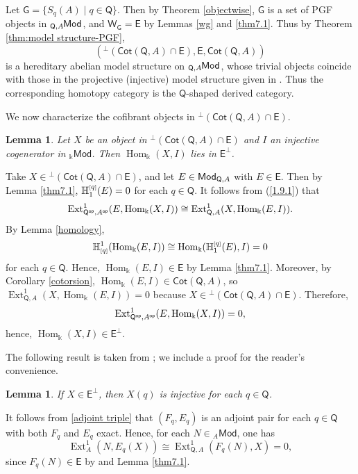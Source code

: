 \documentclass{amsart}
\theoremstyle{bfupright head,slanted body}
\theoremstyle{bfupright head,upright body}
\theoremstyle{fixed bf head,slanted body}
\newtheorem{lem}[res]{Lemma}            \newtheorem*{lem*}{Lemma}
\theoremstyle{fixed bf head,upright body}
\theoremstyle{numbered paragraph}
\newenvironment{prf*}[1][Proof]{%
	\begin{proof}[\bf #1]
		\setcounter{equation}{0}
		\renewcommand{\theequation}{\arabic{equation}}}
	{\end{proof}
}
\numberwithin{equation}{res}
\newcommand{\Cot}[1]{\mathsf{Cot}(#1)}
\newcommand{\Mod}[1]{{_{#1}\mathsf{Mod}}}
\newcommand{\Hom}[3][]{\operatorname{Hom}_{#1}(#2,#3)}
\newcommand{\Ext}[4][]{\operatorname{Ext}_{#1}^{#2}(#3,#4)}
\newcommand{\hH}[2][1]{\mathbb{H}_{#1}^{\textnormal{\tiny[}#2\textnormal{\tiny]}}}
\newcommand{\cH}[2][1]{\mathbb{H}^{#1}_{\textnormal{\tiny[}#2\textnormal{\tiny]}}}
\newcommand{\E}{\mathsf{E}}
\newcommand{\G}{\mathsf{G}}
\newcommand{\WG}{\mathsf{W}_{\mathsf{G}}}
\newcommand{\Q}{\mathsf{Q}}
\newcommand{\is}{\cong}
\newcommand{\lMod}[1]{{}_{#1}\mspace{-1mu}{\sf{Mod}}}
\newcommand{\rMod}[1]{{\sf{Mod}}_{#1}}
\begin{document}
\begin{prf*}
Let $\G=\{S_{q}(A)\mid q\in \Q\}$. Then by Theorem \ref{objectwise}, $\G$ is a set of PGF objects in $\lMod{\Q,A}$, and $\WG=\E$ by Lemmas \ref{wg} and \ref{thm7.1}. Thus by Theorem \ref{thm:model structure-PGF},
\[(^{\perp}(\Cot{\Q,A}\cap\E), \E, \Cot{\Q,A})\]
is a hereditary abelian model structure on $\lMod{\Q,A}$, whose trivial objects coincide with those in the projective (injective) model structure given in \cite[Theorem A]{HJ21}. Thus the corresponding homotopy category is the $\Q$-shaped derived category.
\end{prf*}

We now characterize the cofibrant objects in $^{\perp}(\Cot{\Q,A}\cap\E)$.

\begin{lem}\label{dgflat}
Let $X$ be an object in $^\perp(\Cot{\Q,A}\cap\E)$ and $I$ an injective cogenerator in $\Mod{\Bbbk}$. Then $\Hom[\Bbbk]{X}{I}$ lies in $\E^\perp$.
\end{lem}

\begin{prf*}
Take $X\in {}^\perp(\Cot{\Q,A}\cap\E)$, and let $E\in\rMod{\Q,A}$ with $E\in\E$.
Then by Lemma \ref{thm7.1}, $\hH[1]{q}(E)=0$ for each $q\in\Q$.
It follows from (\ref{1.9.1}) that
\[
\Ext[\Q^{\sf op},A^{\sf op}]{1}{E}{\Hom[\Bbbk]{X}{I}}\is\Ext[\Q,A]{1}{X}{\Hom[\Bbbk]{E}{I}}.\]
By Lemma \ref{homology},
$$\cH[1]{q}(\Hom[\Bbbk]{E}{I})\is\Hom[\Bbbk]{\hH[1]{q}(E)}{I}=0$$
for each $q\in\Q$. Hence, $\Hom[\Bbbk]{E}{I}\in\E$ by Lemma \ref{thm7.1}.
Moreover, by Corollary \ref{cotorsion}, $\Hom[\Bbbk]{E}{I}\in\Cot{\Q,A}$, so $\Ext[\Q,A]{1}{X}{\Hom[\Bbbk]{E}{I}}=0$ because $X\in{^\perp(\Cot{\Q,A}\cap\E)}$. Therefore,
\[\Ext[\Q^{\sf op},A^{\sf op}]{1}{E}{\Hom[\Bbbk]{X}{I}}=0,\]
hence, $\Hom[\Bbbk]{X}{I}\in\E^\perp$.
\end{prf*}

The following result is taken from \cite[Theorem E]{HJ23}; we include a proof for the reader's convenience.

\begin{lem}\label{inj}
If $X\in\E^\perp$, then $X(q)$ is injective for each $q\in\Q$.
\end{lem}

\begin{prf*}
It follows from \ref{adjoint triple} that $(F_q, E_q)$ is an adjoint pair for each $q\in\Q$ with both $F_q$ and $E_q$ exact. Hence, for each $N\in\Mod{A}$, one has \[\Ext[A]{1}{N}{E_q(X)}\is\Ext[\Q,A]{1}{F_q(N)}{X}=0,\]
since $F_q(N)\in\E$ by \cite[Lemma 7.14]{HJ21} and Lemma \ref{thm7.1}.
\end{prf*}
\end{document}
